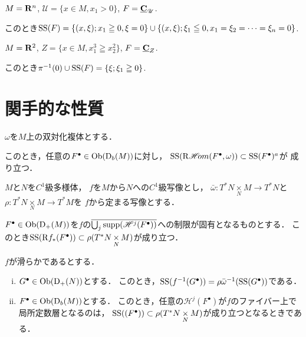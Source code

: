\begin{EG}
    \(M=\mathbf{R}^n\), \(\mathscr{U}=\{x\in M, x_1>0\}\), \(F=\underline{\mathbf{C}}_\mathscr{U}\). 
    
    このとき\(\mathop{\mathrm{SS}}\nolimits(F)=\{(x,\xi);x_1\geqq0,\xi=0\}\cup\{(x,\xi);\xi_1\leqq0,x_1=\xi_2=\dots=\xi_n=0\}\).
\end{EG}

\begin{EG}
    \(M=\mathbf{R}^2\), \(Z=\{x\in M, x_1^3\geqq x_2^2\}\), \(F=\underline{\mathbf{C}}_Z\). 
    
    このとき\(\pi^{-1}(0)\cup\mathop{\mathrm{SS}}\nolimits(F)=\{\xi;\xi_1\geqq0\}\).
\end{EG}

\section{関手的な性質}

\begin{PRP}
    \(\omega\)を\(M\)上の双対化複体とする．

    このとき，任意の\(F^\bullet\in\mathop{\textrm{Ob}}\nolimits({\mathrm{D}}_b(M))\)に対し，
    \(\mathop{\mathrm{SS}}\nolimits(\mathop{\mathrm{R}\hspace{-1.5pt}\mathop{\mathscr{H}\hspace{-2pt}om}\nolimits}\nolimits(F^\bullet,\omega))\subset\mathop{\mathrm{SS}}\nolimits(F^\bullet)^a\)が
    成り立つ．
\end{PRP}

\(M\)と\(N\)を\(C^1\)級多様体，
\(f\)を\(M\)から\(N\)への\(C^1\)級写像とし，
\(\bar{\omega}\colon T^\ast N\mathop{\times}\limits_N M\to T^\ast N\)と
\(\rho\colon T^\ast N\mathop{\times}\limits_N M\to T^\ast M\)を
\(f\)から定まる写像とする．

\begin{PRP}
    \(F^\bullet\in\mathop{\textrm{Ob}}\nolimits({\mathrm{D}}_+(M))\)を\(f\)の\(
        \overline{\bigcup_j\mathop{\mathrm{supp}}\nolimits(\mathscr{H}^j(F^\bullet))}
    \)への制限が固有となるものとする．
    このとき\(\mathop{\mathrm{SS}}\nolimits(\mathrm{R}f_\ast(F^\bullet))\subset\rho(T^\ast N\mathop{\times}\limits_NM)\)が成り立つ．
\end{PRP}

\begin{PRP}
    \(f\)が滑らかであるとする．
    \begin{enumerate}[(i)]
        \item \(G^\bullet\in\mathop{\textrm{Ob}}\nolimits({\mathrm{D}}_+(N))\)とする．
        このとき，\(\mathop{\mathrm{SS}}\nolimits(f^{-1}(G^\bullet))=\rho\bar{\omega}^{-1}(\mathop{\mathrm{SS}}\nolimits(G^\bullet))\)である．
        \item \(F^\bullet\in\mathop{\textrm{Ob}}\nolimits({\mathrm{D}}_b(M))\)とする．
        このとき，任意の\(\mathscr{H}^j(F^\bullet)\)が\(f\)のファイバー上で
        局所定数層となるのは，
        \(\mathop{\mathrm{SS}}\nolimits((F^\bullet))\subset\rho(T^\ast N\mathbin{\mathop{\times}\limits_N} M)\)が成り立つとなるときである．
    \end{enumerate}
\end{PRP}

